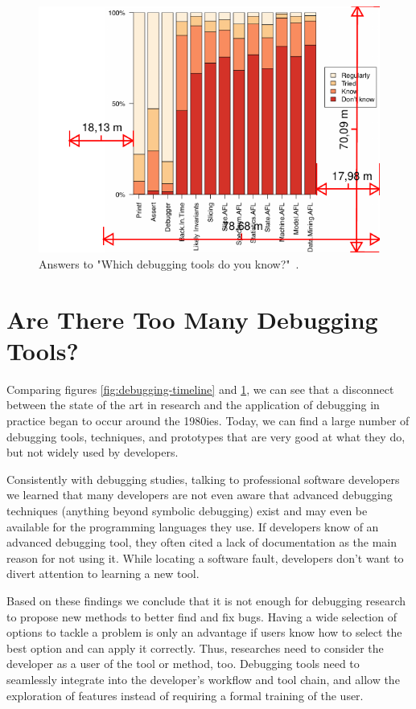 \begin{figure}[t]
\centering
\includegraphics[width=.8\linewidth]{img/tool-usage}
\caption{Answers to "Which debugging tools do you know?"~\cite{perscheid17:studying_the_advancement}.}
\label{fig:tool-usage}
\end{figure}

\section{Are There Too Many Debugging Tools?}

Comparing figures \ref{fig:debugging-timeline} and \ref{fig:tool-usage}, we can see that a disconnect between the state of the art in research and the application of debugging in practice began to occur around the 1980ies.
Today, we can find a large number of debugging tools, techniques, and prototypes that are very good at what they do, but not widely used by developers.

Consistently with debugging studies, talking to professional software developers we learned that many developers are not even aware that advanced debugging techniques (\ie anything beyond symbolic debugging) exist and may even be available for the programming languages they use.
If developers know of an advanced debugging tool, they often cited a lack of documentation as the main reason for not using it.
While locating a software fault, developers don't want to divert attention to learning a new tool.

Based on these findings we conclude that it is not enough for debugging research to propose new methods to better find and fix bugs.
Having a wide selection of options to tackle a problem is only an advantage if users know how to select the best option and can apply it correctly.
Thus, researches need to consider the developer as a user of the tool or method, too.
Debugging tools need to seamlessly integrate into the developer's workflow and tool chain, and allow the exploration of features instead of requiring a formal training of the user.

